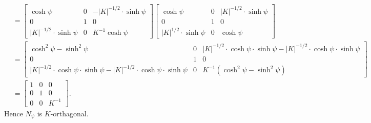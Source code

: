 \documentclass{ximera}
\begin{document}
\begin{problem}
\begin{freeResponse}
\begin{align*}
&=\begin{bmatrix}
    \cosh\psi & 0 & -|K|^{-1/2}\cdot\sinh\psi\\
    0 & 1 & 0\\
    |K|^{-1/2}\cdot\sinh\psi & 0 &  K^{-1}\cosh\psi
      \end{bmatrix}
 \begin{bmatrix}
    \cosh\psi & 0 & |K|^{-1/2}\cdot\sinh\psi\\
    0 & 1 & 0\\
    |K|^{1/2}\cdot\sinh\psi & 0 & \cosh\psi
 \end{bmatrix}\\
&=\begin{bmatrix}
    \cosh^2\psi -\sinh^2\psi & 0 & |K|^{-1/2}\cdot\cosh\psi\cdot\sinh\psi- |K|^{-1/2}\cdot\cosh\psi\cdot\sinh\psi\\
    0 & 1 & 0\\
    |K|^{-1/2}\cdot\cosh\psi\cdot\sinh\psi- |K|^{-1/2}\cdot\cosh\psi\cdot\sinh\psi & 0 &  K^{-1}(\cosh^2\psi -\sinh^2\psi )
 \end{bmatrix}\\
 &=\begin{bmatrix}
        1 & 0 & 0 \\
        0 & 1 & 0 \\
        0 & 0 & K^{-1}
      \end{bmatrix}.
    \end{align*}
    Hence $N_\psi$ is $K$-orthagonal.
  \end{freeResponse}
\end{problem}
\end{document}
